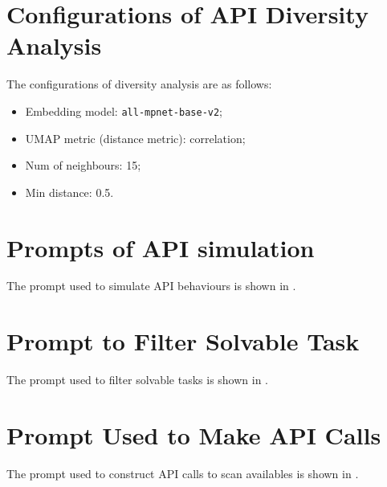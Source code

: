 \section{Configurations of API Diversity Analysis }\label{app:diversity_conf}
The configurations of diversity analysis are as follows:
\begin{itemize}
    \item Embedding model: \texttt{all-mpnet-base-v2};
    \item UMAP metric (distance metric): correlation;
    \item Num of neighbours: 15;
    \item Min distance: 0.5.
\end{itemize}


\section{Prompts of API simulation}
\label{app:prompt_simulation}


The prompt used to simulate API behaviours is shown in .


\section{Prompt to Filter Solvable Task}
\label{app:prompt_task_solvability}
The prompt used to filter solvable tasks is shown in .




\section{Prompt Used to Make API Calls}\label{app:prompt_make_call}
The prompt used to construct API calls to scan availables is shown in .

